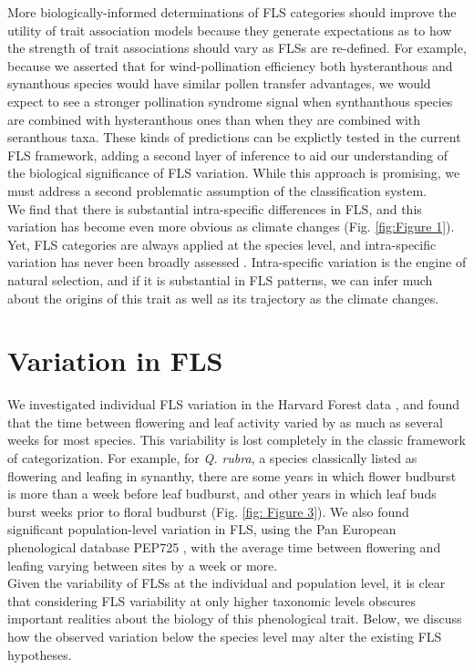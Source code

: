 \documentclass[12pt]{article}\usepackage[]{graphicx}\usepackage[]{color}
\begin{document}
\indent More biologically-informed determinations of FLS categories should improve the utility of trait association models because they generate expectations as to how the strength of trait associations should vary as FLSs are re-defined. For example, because we asserted that for wind-pollination efficiency both hysteranthous and synanthous species would have similar pollen transfer advantages, we would expect to see a stronger pollination syndrome signal when synthanthous species are combined with hysteranthous ones than when they are combined with seranthous taxa. These kinds of predictions can be explictly tested in the current FLS framework, adding a second layer of inference to aid our understanding of the biological significance of FLS variation. While this approach is promising, we must address a second problematic assumption of the classification system. \\ %

\indent We find that there is substantial intra-specific differences in FLS, and this variation has become even more obvious as climate changes (Fig. \ref{fig:Figure 1}). Yet, FLS categories are always applied at the species level, and intra-specific variation has never been broadly assessed \citep{Gougherty2018}. Intra-specific variation is the engine of natural selection, and if it is substantial in FLS patterns, we can infer much about the origins of this trait as well as its trajectory as the climate changes.

\section*{Variation in FLS}
 \indent\indent We investigated individual FLS variation in the Harvard Forest data \citep{OKeefe2015}, and found that the time between flowering and leaf activity varied by as much as several weeks for most species. This variability is lost completely in the classic framework of categorization. For example, for  \textit{Q. rubra}, a species classically listed as flowering and leafing in synanthy, there are some years in which flower budburst is more than a week before leaf budburst, and other years in which leaf buds burst weeks prior to floral budburst (Fig. \ref{fig: Figure 3}). We also found significant population-level variation in FLS, using the Pan European phenological database PEP725 \citep{PEP725}, with the average time between flowering and leafing varying between sites by a week or more.\\
\indent Given the variability of FLSs at the individual and population level, it is clear that considering FLS variability at only higher taxonomic levels obscures important realities about the biology of this phenological trait. Below, we discuss how the observed variation below the species level may alter the existing FLS hypotheses.
\end{document}
